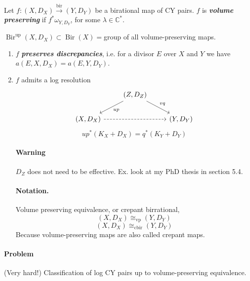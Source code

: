 \begin{example}
	[content…]
\end{example}

\begin{defn}
	Let $f:(X,D_X)\overset{\operatorname{bir}}{\longrightarrow}(Y,D_Y)$ be a birational map of CY pairs. $f$ is \textit{\textbf{volume preserving}} if $f^* \omega_{Y,D_Y}$, for some $\lambda\in\mathbb{C}^*$.
\end{defn}

\begin{remark}
	$\operatorname{Bir}^{\operatorname{up}}(X,D_X) \subset \operatorname{Bir}(X)=$group of all volume-preserving maps.
\end{remark}

\begin{defn}\leavevmode 
	\begin{enumerate}[label=(\roman*)]
		\item $f$ \textit{\textbf{preserves discrepancies}}, i.e. for a divisor  $E$ over $X$ and $Y$ we have $a(E,X,D_X)=a(E,Y,D_Y)$.

		\item $f$ admits a log resolution
			\[\begin{tikzcd}
				& (Z,D_Z)\arrow[dr,"vq"]\arrow[dl,"up"]\\
				(X,D_X)\arrow[rr,dashed]&&(Y,D_Y)
			\end{tikzcd}\]
			\[up^*(K_X+D_X)=q^*(K_Y+D_Y)\]

			\paragraph{Warning} $D_Z$ does not need to be effective. Ex. look at my PhD thesis in section 5.4.

			\paragraph{Notation.} Volume preserving equivalence, or crepant birrational,
			\[(X,D_X)\cong_{\operatorname{vp}}(Y,D_Y)\]
			\[(X,D_X)\cong_{\operatorname{cbir}}(Y,D_Y)\]
			Because volume-preserving maps are also called crepant maps.

	\end{enumerate}
\end{defn}

\paragraph{Problem} (Very hard!) Classification of log CY pairs up to volume-preserving equivalence.

